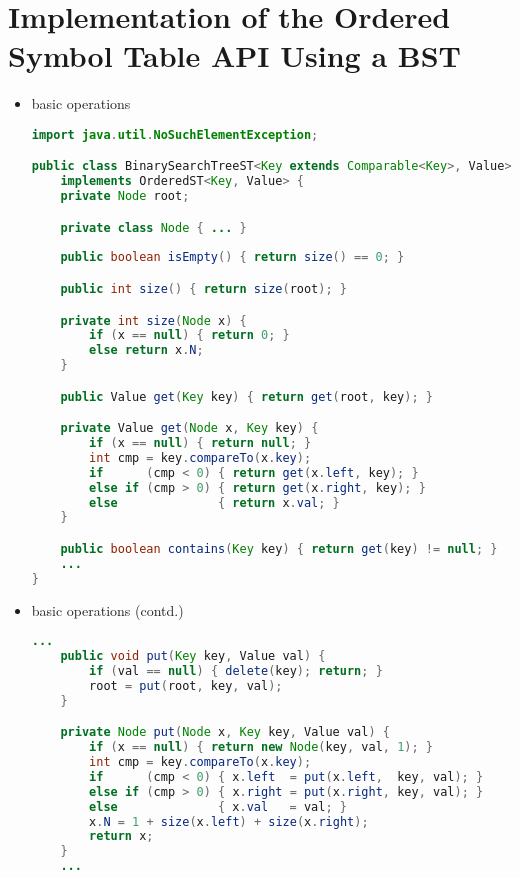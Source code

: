 \documentclass[8pt,a4paper,compress]{beamer}
\begin{document}
\section{Implementation of the Ordered Symbol Table API Using a BST}
\begin{frame}[fragile]
\begin{itemize}
\item basic operations
\begin{lstlisting}[language=Java]
import java.util.NoSuchElementException;

public class BinarySearchTreeST<Key extends Comparable<Key>, Value> 
    implements OrderedST<Key, Value> {
    private Node root;

    private class Node { ... }
    
    public boolean isEmpty() { return size() == 0; }

    public int size() { return size(root); }

    private int size(Node x) {
        if (x == null) { return 0; }
        else return x.N;
    }

    public Value get(Key key) { return get(root, key); }

    private Value get(Node x, Key key) {
        if (x == null) { return null; }
        int cmp = key.compareTo(x.key);
        if      (cmp < 0) { return get(x.left, key); }
        else if (cmp > 0) { return get(x.right, key); }
        else              { return x.val; }
    }

    public boolean contains(Key key) { return get(key) != null; }
    ...
}
\end{lstlisting}
\end{itemize}
\end{frame}

\begin{frame}[fragile]
\begin{itemize}
\item basic operations (contd.)
\begin{lstlisting}[language=Java]
    ...
    public void put(Key key, Value val) {
        if (val == null) { delete(key); return; }
        root = put(root, key, val);
    }

    private Node put(Node x, Key key, Value val) {
        if (x == null) { return new Node(key, val, 1); }
        int cmp = key.compareTo(x.key);
        if      (cmp < 0) { x.left  = put(x.left,  key, val); }
        else if (cmp > 0) { x.right = put(x.right, key, val); }
        else              { x.val   = val; }
        x.N = 1 + size(x.left) + size(x.right);
        return x;
    }
    ...
\end{lstlisting}
\end{itemize}
\end{frame}
\end{document}
